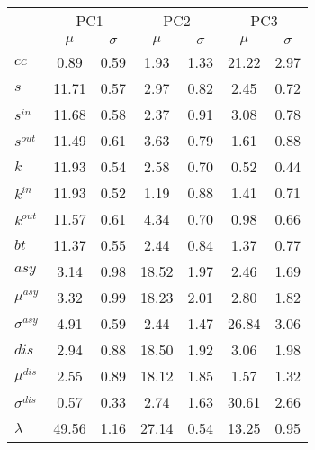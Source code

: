 \begin{center}
\begin{tabular}{| l | c | c | c | c | c | c |}\cline{2-7}
\multicolumn{1}{c|}{} & \multicolumn{2}{c|}{PC1}          & \multicolumn{2}{c|}{PC2} & \multicolumn{2}{c|}{PC3}  \\\cline{2-7}\multicolumn{1}{c|}{} & $\mu$            & $\sigma$ & $\mu$         & $\sigma$ & $\mu$ & $\sigma$  \\\hline
$cc$ & 0.89  & 0.59  & 1.93  & 1.33  & 21.22  & 2.97 \\\hline
$s$ & 11.71  & 0.57  & 2.97  & 0.82  & 2.45  & 0.72 \\
$s^{in}$ & 11.68  & 0.58  & 2.37  & 0.91  & 3.08  & 0.78 \\
$s^{out}$ & 11.49  & 0.61  & 3.63  & 0.79  & 1.61  & 0.88 \\
$k$ & 11.93  & 0.54  & 2.58  & 0.70  & 0.52  & 0.44 \\
$k^{in}$ & 11.93  & 0.52  & 1.19  & 0.88  & 1.41  & 0.71 \\
$k^{out}$ & 11.57  & 0.61  & 4.34  & 0.70  & 0.98  & 0.66 \\
$bt$ & 11.37  & 0.55  & 2.44  & 0.84  & 1.37  & 0.77 \\\hline
$asy$ & 3.14  & 0.98  & 18.52  & 1.97  & 2.46  & 1.69 \\
$\mu^{asy}$ & 3.32  & 0.99  & 18.23  & 2.01  & 2.80  & 1.82 \\
$\sigma^{asy}$ & 4.91  & 0.59  & 2.44  & 1.47  & 26.84  & 3.06 \\
$dis$ & 2.94  & 0.88  & 18.50  & 1.92  & 3.06  & 1.98 \\
$\mu^{dis}$ & 2.55  & 0.89  & 18.12  & 1.85  & 1.57  & 1.32 \\
$\sigma^{dis}$ & 0.57  & 0.33  & 2.74  & 1.63  & 30.61  & 2.66 \\
$\lambda$ & 49.56  & 1.16  & 27.14  & 0.54  & 13.25  & 0.95 \\
\hline\end{tabular}
\end{center}